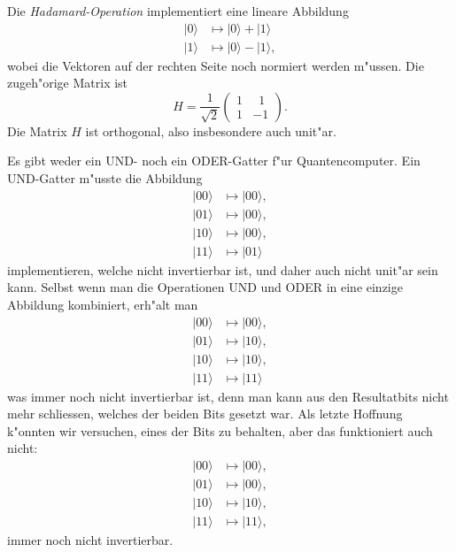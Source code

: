 \begin{beispiel}
Die {\em Hadamard-Operation} implementiert eine lineare Abbildung
\begin{align*}
|0\rangle &\mapsto |0\rangle + |1\rangle\\
|1\rangle &\mapsto |0\rangle - |1\rangle,
\end{align*}
wobei die Vektoren auf der rechten Seite noch normiert werden m"ussen.
Die zugeh"orige Matrix ist
\begin{equation}
H=
\frac1{\sqrt{2}}
\begin{pmatrix}
1&\phantom{1}1\\
1&-1
\end{pmatrix}.
\label{skript:hadamard}
\end{equation}
Die Matrix $H$ ist orthogonal, also insbesondere auch unit"ar.
\end{beispiel}

\begin{beispiel}
Es gibt weder ein UND- noch ein ODER-Gatter f"ur Quantencomputer.
Ein UND-Gatter m"usste die Abbildung
\begin{align*}
|00\rangle&\mapsto|00\rangle,\\
|01\rangle&\mapsto|00\rangle,\\
|10\rangle&\mapsto|00\rangle,\\
|11\rangle&\mapsto|01\rangle
\end{align*}
implementieren, welche nicht invertierbar ist, und daher auch nicht
unit"ar sein kann.
Selbst wenn man die Operationen UND und ODER in eine einzige Abbildung
kombiniert, erh"alt man
\begin{align*}
|00\rangle&\mapsto|00\rangle,\\
|01\rangle&\mapsto|10\rangle,\\
|10\rangle&\mapsto|10\rangle,\\
|11\rangle&\mapsto|11\rangle
\end{align*}
was immer noch nicht invertierbar ist, denn man kann aus den Resultatbits
nicht mehr schliessen, welches der beiden Bits gesetzt war.
Als letzte Hoffnung k"onnten wir versuchen, eines der Bits zu behalten,
aber das funktioniert auch nicht:
\begin{align*}
|00\rangle&\mapsto|00\rangle,\\
|01\rangle&\mapsto|00\rangle,\\
|10\rangle&\mapsto|10\rangle,\\
|11\rangle&\mapsto|11\rangle,
\end{align*}
immer noch nicht invertierbar.
\end{beispiel}


